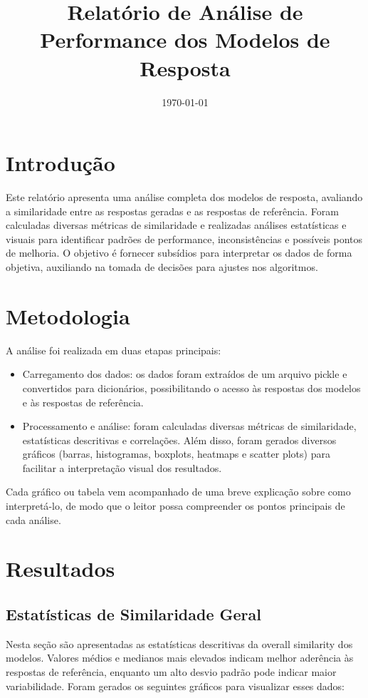 \documentclass{article}%
\title{Relatório de Análise de Performance dos Modelos de Resposta}%
\date{\today}%
\begin{document}
%
\normalsize%
\maketitle%
\section*{Introdução}%
\label{sec:Introduo}%
Este relatório apresenta uma análise completa dos modelos de resposta, avaliando a similaridade entre as respostas geradas e as respostas de referência. Foram calculadas diversas métricas de similaridade e realizadas análises estatísticas e visuais para identificar padrões de performance, inconsistências e possíveis pontos de melhoria. O objetivo é fornecer subsídios para interpretar os dados de forma objetiva, auxiliando na tomada de decisões para ajustes nos algoritmos.

%
\section*{Metodologia}%
\label{sec:Metodologia}%
A análise foi realizada em duas etapas principais:\newline%
\newline%
%
\begin{itemize}%
\item Carregamento dos dados: os dados foram extraídos de um arquivo pickle e convertidos para dicionários, possibilitando o acesso às respostas dos modelos e às respostas de referência.%
\item Processamento e análise: foram calculadas diversas métricas de similaridade, estatísticas descritivas e correlações. Além disso, foram gerados diversos gráficos (barras, histogramas, boxplots, heatmaps e scatter plots) para facilitar a interpretação visual dos resultados.%
\end{itemize}%
Cada gráfico ou tabela vem acompanhado de uma breve explicação sobre como interpretá{-}lo, de modo que o leitor possa compreender os pontos principais de cada análise.

%
\section*{Resultados}%
\label{sec:Resultados}%
\subsection*{Estatísticas de Similaridade Geral}%
\label{subsec:EstatsticasdeSimilaridadeGeral}%
Nesta seção são apresentadas as estatísticas descritivas da overall similarity dos modelos. Valores médios e medianos mais elevados indicam melhor aderência às respostas de referência, enquanto um alto desvio padrão pode indicar maior variabilidade.%
\newline%
Foram gerados os seguintes gráficos para visualizar esses dados:%
\end{document}
